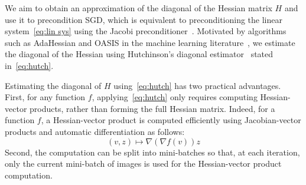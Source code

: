 \documentclass{article}
\begin{document}
We aim to obtain an approximation of the diagonal of the Hessian matrix $H$ and 
use it to precondition SGD, which is equivalent to preconditioning the linear 
system~\eqref{eq:lin sys} using the Jacobi preconditioner~\cite{trefethen_numerical_1997}.
Motivated by algorithms such as AdaHessian and OASIS in the machine learning 
literature~\cite{yao_adahessian_2021,jahani_doubly_2022}, we estimate the diagonal 
of the Hessian using Hutchinson's diagonal estimator~\cite{bekas_estimator_2007}
stated in~\eqref{eq:hutch}.

Estimating the diagonal of $H$ using~\eqref{eq:hutch} has two practical advantages. 
First, for any function $f$, applying~\eqref{eq:hutch} only requires computing 
Hessian-vector products, rather than forming the full Hessian matrix. 
Indeed, for a function $f$, a Hessian-vector product is computed efficiently 
using Jacobian-vector products and automatic differentiation as follows:
\begin{equation*}
    (v, z) \mapsto \nabla\left(\nabla f(v)\right) z
\end{equation*}
Second, the computation can be split into mini-batches so that, at each iteration,
only the current mini-batch of images is used for the Hessian-vector product computation.
\end{document}
